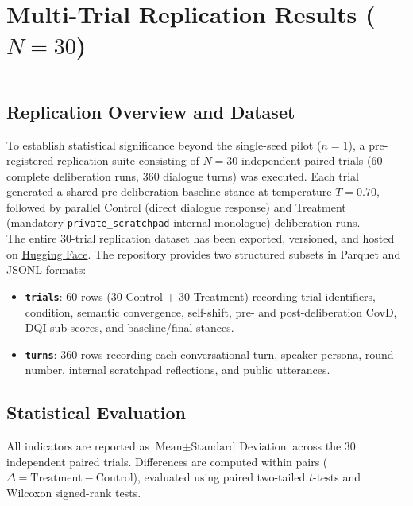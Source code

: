\documentclass[titlepage]{article}
\begin{document}
\newpage{}

\section{Multi-Trial Replication Results (\texorpdfstring{$N = 30$}{N = 30})}
\label{sec:replicationresults}
\rule{\textwidth}{0.4pt}

\subsection{Replication Overview and Dataset}
To establish statistical significance beyond the single-seed pilot ($n=1$), a pre-registered replication suite consisting of $N = 30$ independent paired trials (60 complete deliberation runs, 360 dialogue turns) was executed. Each trial generated a shared pre-deliberation baseline stance at temperature $T = 0.70$, followed by parallel Control (direct dialogue response) and Treatment (mandatory \texttt{private\_scratchpad} internal monologue) deliberation runs.\\

The entire 30-trial replication dataset has been exported, versioned, and hosted on \href{https://huggingface.co/datasets/yashpola/simple-simulation-school-closure}{Hugging Face}. The repository provides two structured subsets in Parquet and JSONL formats:
\begin{itemize}
    \item \textbf{\texttt{trials}}: 60 rows (30 Control + 30 Treatment) recording trial identifiers, condition, semantic convergence, self-shift, pre- and post-deliberation CovD, DQI sub-scores, and baseline/final stances.
    \item \textbf{\texttt{turns}}: 360 rows recording each conversational turn, speaker persona, round number, internal scratchpad reflections, and public utterances.
\end{itemize}

\subsection{Statistical Evaluation}
All indicators are reported as $\text{Mean} \pm \text{Standard Deviation}$ across the 30 independent paired trials. Differences are computed within pairs ($\Delta = \text{Treatment} - \text{Control}$), evaluated using paired two-tailed $t$-tests and Wilcoxon signed-rank tests.
\end{document}
